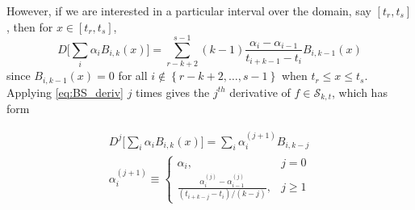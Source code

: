 \documentclass[12pt]{article}
\theoremstyle{definition}
\begin{document}
\begin{enumerate}
\begin{description}
However, if we are interested in a particular interval over the domain, say $\left[t_r,t_s\right]$, then for $x \in \left[t_r,t_s\right]$,
\[
D \bigg[ \sum_i \alpha_i B_{i,k}\left(x\right) \bigg]  = \sum_{r-k+2}^{s-1}\left(k-1\right) \frac{\alpha_i-\alpha_{i-1}}{t_{i+k-1} - t_i}B_{i,k-1}\left(x\right)
\]
since $B_{i,k-1}\left(x\right)=0$ for all $i \not \in \left\{r-k+2,\dots, s-1 \right\}$ when $t_r \le x\le t_s$. Applying \ref{eq:BS_deriv} $j$ times gives the $j^{th}$ derivative of $f \in \mathscr{S}_{k,t}$, which has form

\begin{subequations} 
\begin{align}
D^j \bigg[ \sum_i \alpha_i B_{i,k}\left(x\right) \bigg] =  \sum_i \alpha_i^{\left(j+1\right)} B_{i,k-j} \label{eq:BS_jth_deriv_a} \\
\alpha_i^{\left(j+1\right)} \equiv \left\{ \begin{array}{cl} \alpha_i, & j = 0 \\
						\frac{\alpha_i^{\left(j\right)} - \alpha_{i-1}^{\left(j\right)} }{\left( t_{i+k-j}-t_{i}\right)/\left(k-j\right)}, & j \ge 1 
  \end{array} \right.\label{eq:BS_jth_deriv_b}
\end{align}
\end{subequations}


\end{description}
\end{enumerate}
\end{document}
